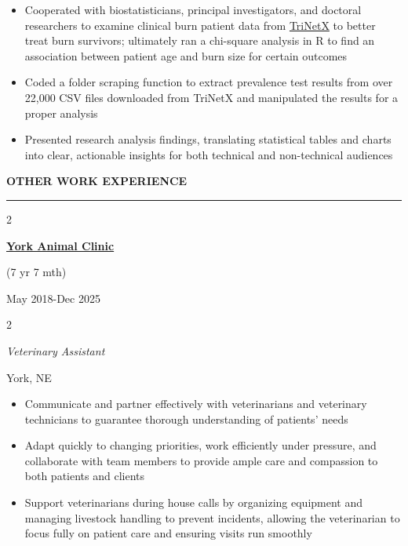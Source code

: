 \documentclass[
  16,
]{article}
\providecommand{\tightlist}{%
  \setlength{\itemsep}{0pt}\setlength{\parskip}{0pt}}
\begin{document}
\begin{itemize}
\tightlist
\item
  Cooperated with biostatisticians, principal investigators, and
  doctoral researchers to examine clinical burn patient data from
  \href{https://trinetx.com}{TriNetX} to better treat burn survivors;
  ultimately ran a chi-square analysis in R to find an association
  between patient age and burn size for certain outcomes
\item
  Coded a folder scraping function to extract prevalence test results
  from over 22,000 CSV files downloaded from TriNetX and manipulated the
  results for a proper analysis
\item
  Presented research analysis findings, translating statistical tables
  and charts into clear, actionable insights for both technical and
  non-technical audiences
\end{itemize}

\vspace{3pt}

\begin{large}{\bf OTHER WORK EXPERIENCE}
  \vspace{3pt}
  \hrule
  \begin{multicols}{2}
    \begin{flushleft}{\bf \href{http://www.yorkanimalclinic.com}{York Animal Clinic}}\end{flushleft}
    \begin{flushright}
    \begin{small}(7 yr 7 mth)\end{small}
    May 2018-Dec 2025\end{flushright}
  \end{multicols}
  \vspace{-0.17cm}
  \begin{multicols}{2}
    \begin{flushleft}\textit{Veterinary Assistant}\end
    {flushleft}\begin{flushright}York, NE\end
    {flushright}
  \end{multicols}
\end{large}
\vspace{-0.16cm}

\begin{itemize}
\tightlist
\item
  Communicate and partner effectively with veterinarians and veterinary
  technicians to guarantee thorough understanding of patients' needs
\item
  Adapt quickly to changing priorities, work efficiently under pressure,
  and collaborate with team members to provide ample care and compassion
  to both patients and clients
\item
  Support veterinarians during house calls by organizing equipment and
  managing livestock handling to prevent incidents, allowing the
  veterinarian to focus fully on patient care and ensuring visits run
  smoothly
\end{itemize}
\end{document}
